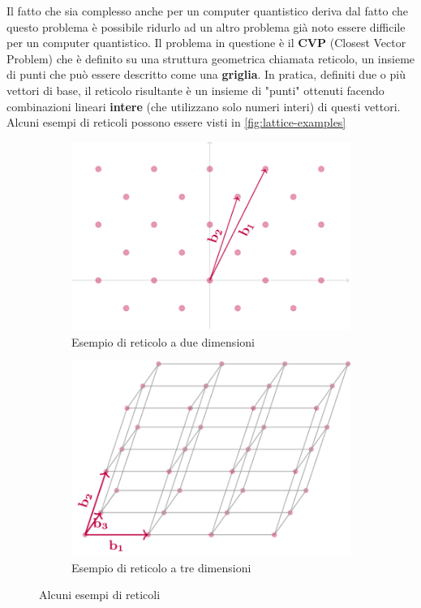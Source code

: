 Il fatto che sia complesso anche per un computer quantistico deriva dal fatto che questo problema è possibile ridurlo ad un altro problema già noto essere difficile per un computer quantistico. Il problema in questione è il \textbf{CVP} (Closest Vector Problem) che è definito su una struttura geometrica chiamata reticolo, un insieme di punti che può essere descritto come una \textbf{griglia}. In pratica, definiti due o più vettori di base, il reticolo risultante è un insieme di "punti" ottenuti facendo combinazioni lineari \textbf{intere} (che utilizzano solo numeri interi) di questi vettori. Alcuni esempi di reticoli possono essere visti in \autoref{fig:lattice-examples}

\begin{figure}[h]
    \begin{subfigure}{0.4\textwidth}
        \includegraphics[width=1\textwidth]{capitoli/figure-crittografia/lattice-2.png}
        \caption{Esempio di reticolo a due dimensioni}
    \end{subfigure}
    \hfill
    \begin{subfigure}{0.4\textwidth}
        \includegraphics[width=1\textwidth]{capitoli/figure-crittografia/lattice-3.png}
        \caption{Esempio di reticolo a tre dimensioni}
    \end{subfigure}
    \caption{Alcuni esempi di reticoli}
    \label{fig:lattice-examples}
\end{figure}

